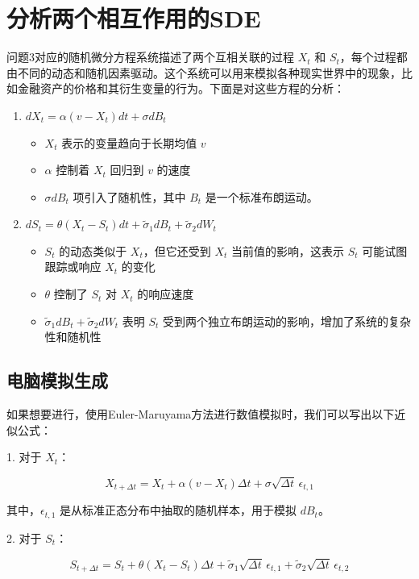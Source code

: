 \documentclass[12pt,a4paper]{article}
\begin{document}
\section{分析两个相互作用的SDE}
问题3对应的随机微分方程系统描述了两个互相关联的过程 \( X_t \) 和 \( S_t \)，每个过程都由不同的动态和随机因素驱动。这个系统可以用来模拟各种现实世界中的现象，比如金融资产的价格和其衍生变量的行为。下面是对这些方程的分析：
\begin{enumerate}
    \item \( dX_t = \alpha(v - X_t)dt + \sigma dB_t \)
    \begin{itemize}
        \item \( X_t \) 表示的变量趋向于长期均值 \( v \)
        \item \( \alpha \) 控制着 \( X_t \) 回归到 \( v \) 的速度
        \item \( \sigma dB_t \) 项引入了随机性，其中 \( B_t \) 是一个标准布朗运动。
    \end{itemize}
    \item \( dS_t = \theta(X_t - S_t)dt + \tilde{\sigma}_1 dB_t + \tilde{\sigma}_2 dW_t \)
    \begin{itemize}
        \item \( S_t \) 的动态类似于 \( X_t \)，但它还受到 \( X_t \) 当前值的影响，这表示 \( S_t \) 可能试图跟踪或响应 \( X_t \) 的变化
        \item \( \theta \) 控制了 \( S_t \) 对 \( X_t \) 的响应速度
        \item \( \tilde{\sigma}_1 dB_t + \tilde{\sigma}_2 dW_t \) 表明 \( S_t \) 受到两个独立布朗运动的影响，增加了系统的复杂性和随机性
    \end{itemize}
\end{enumerate}

\subsection{电脑模拟生成}
如果想要进行，使用Euler-Maruyama方法进行数值模拟时，我们可以写出以下近似公式：

1. 对于 \( X_t \)：

   \[ X_{t+\Delta t} = X_t + \alpha(v - X_t)\Delta t + \sigma \sqrt{\Delta t} \, \epsilon_{t,1} \]

   其中，\( \epsilon_{t,1} \) 是从标准正态分布中抽取的随机样本，用于模拟 \( dB_t \)。

2. 对于 \( S_t \)：

   \[ S_{t+\Delta t} = S_t + \theta(X_t - S_t)\Delta t + \tilde{\sigma}_1 \sqrt{\Delta t} \, \epsilon_{t,1} + \tilde{\sigma}_2 \sqrt{\Delta t} \, \epsilon_{t,2} \]
\end{document}
